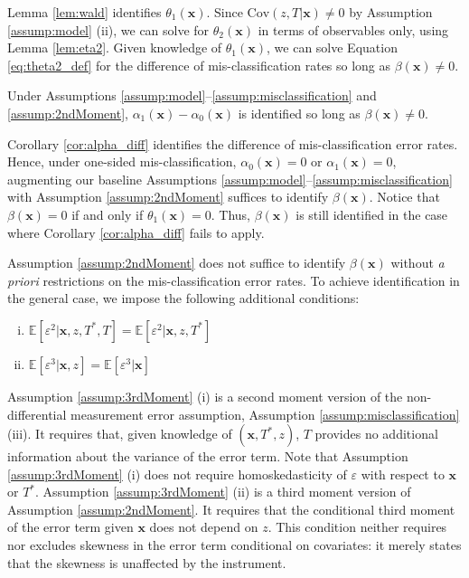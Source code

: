 Lemma \ref{lem:wald} identifies $\theta_1(\mathbf{x})$.
Since $\mbox{Cov}(z,T|\mathbf{x}) \neq 0$ by Assumption \ref{assump:model} (ii), we can solve for $\theta_2(\mathbf{x})$ in terms of observables only, using Lemma \ref{lem:eta2}.
Given knowledge of $\theta_1(\mathbf{x})$, we can solve Equation \ref{eq:theta2_def} for the difference of mis-classification rates so long as $\beta(\mathbf{x}) \neq 0$.

\begin{cor}
  Under Assumptions \ref{assump:model}--\ref{assump:misclassification} and \ref{assump:2ndMoment}, $\alpha_1(\mathbf{x}) - \alpha_0(\mathbf{x})$ is identified so long as $\beta(\mathbf{x}) \neq 0$.
  \label{cor:alpha_diff}
\end{cor}
Corollary \ref{cor:alpha_diff} identifies the difference of mis-classification error rates.
Hence, under one-sided mis-classification, $\alpha_0(\mathbf{x}) = 0$ or $\alpha_1(\mathbf{x}) = 0$, augmenting our baseline Assumptions \ref{assump:model}--\ref{assump:misclassification} with Assumption \ref{assump:2ndMoment} suffices to identify $\beta(\mathbf{x})$.
Notice that $\beta(\mathbf{x})=0$ if and only if $\theta_1(\mathbf{x}) = 0$.
Thus, $\beta(\mathbf{x})$ is still identified in the case where Corollary \ref{cor:alpha_diff} fails to apply.

Assumption \ref{assump:2ndMoment} does not suffice to identify $\beta(\mathbf{x})$ without \emph{a priori} restrictions on the mis-classification error rates.
To achieve identification in the general case, we impose the following additional conditions:
\begin{assump} \mbox{}
  \label{assump:3rdMoment}
  \begin{enumerate}[(i)] 
    \item $\mathbb{E}[\varepsilon^2|\mathbf{x},z,T^*,T] = \mathbb{E}[\varepsilon^2|\mathbf{x},z, T^*]$
    \item $\mathbb{E}[\varepsilon^3|\mathbf{x},z] = \mathbb{E}[\varepsilon^3|\mathbf{x}]$
  \end{enumerate}
\end{assump}

Assumption \ref{assump:3rdMoment} (i) is a second moment version of the non-differential measurement error assumption, Assumption \ref{assump:misclassification} (iii).
It requires that, given knowledge of $(\mathbf{x}, T^*,z)$, $T$ provides no additional information about the variance of the error term.
Note that Assumption \ref{assump:3rdMoment} (i) does not require homoskedasticity of $\varepsilon$ with respect to $\mathbf{x}$ or $T^*$.
Assumption \ref{assump:3rdMoment} (ii) is a third moment version of Assumption \ref{assump:2ndMoment}.
It requires that the conditional third moment of the error term given $\mathbf{x}$ does not depend on $z$.
This condition neither requires nor excludes skewness in the error term conditional on covariates: it merely states that the skewness is unaffected by the instrument.

